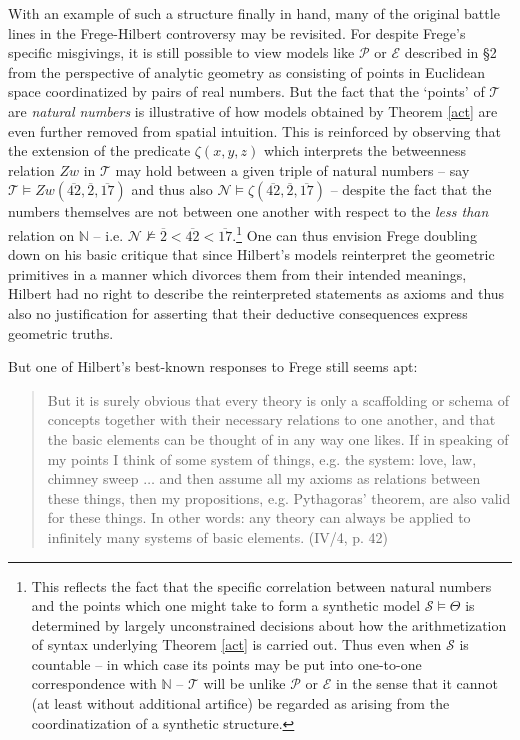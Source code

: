 \documentclass[11pt,fleqn,leqno]{article}
\begin{document}
With an example of such a structure finally in hand, many of the original battle lines in the Frege-Hilbert controversy may be revisited.  For despite Frege's specific misgivings, it is still possible to view models like $\mathcal{P}$ or $\mathcal{E}$ described in \S 2 from the perspective of analytic geometry as consisting of points in Euclidean space coordinatized by pairs of real numbers.  But the fact that the `points' of $\mathcal{T}$ are \textsl{natural numbers} is illustrative of how models obtained by Theorem \ref{act} are even further removed from spatial intuition.   This is reinforced by observing that the extension of the predicate $\zeta(x,y,z)$ which interprets the betweenness relation $Zw$ in $\mathcal{T}$ may hold between a given triple of natural numbers -- say $\mathcal{T} \models Zw(\overline{42},\overline{2},\overline{17})$ and thus also $\mathcal{N} \models \zeta(\overline{42},\overline{2},\overline{17})$  -- despite the fact that the numbers themselves are not between one another with respect to the \textsl{less than} relation on $\mathbb{N}$ -- i.e. $\mathcal{N} \not\models \overline{2} < \overline{42} < \overline{17}$.\footnote{This reflects the fact that the specific correlation between natural numbers and the points which one might take to form a synthetic model $\mathcal{S} \models \Theta$ is determined by largely unconstrained decisions about how the arithmetization of syntax underlying Theorem \ref{act} is carried out.   Thus even when $\mathcal{S}$ is countable -- in which case its points may be put into one-to-one correspondence with $\mathbb{N}$ -- $\mathcal{T}$ will be unlike $\mathcal{P}$ or $\mathcal{E}$ in the sense that it cannot (at least without additional artifice) be regarded as arising from the coordinatization of a synthetic structure.}  One can thus envision Frege doubling down on his basic critique that since Hilbert's models reinterpret the geometric primitives in a manner which divorces them from their intended meanings, Hilbert had no right to describe the reinterpreted statements as axioms and thus also no justification for asserting that their deductive consequences express geometric truths.   

But one of Hilbert's best-known responses to Frege still seems apt:
\begin{quote}
{\small 
But it is surely obvious that every theory is only a scaffolding or schema of concepts together with their necessary relations to one another, and that the basic elements can be thought of in any way one likes. If in speaking of my points I think of some system of things, e.g. the system: love, law, chimney sweep $\ldots$ and then assume all my axioms as relations between these things, then my propositions, e.g. Pythagoras' theorem, are also valid for these things. In other words: any theory can always be applied to infinitely many systems of basic elements. \hfill (IV/4, p. 42)
}
\end{quote}
\end{document}
